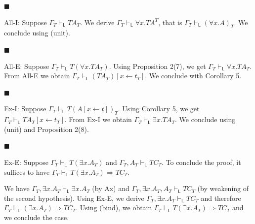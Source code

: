  
 
\par\noindent  $\blacksquare$ 
 
All-I: Suppose $\Gamma_{T}\vdash_{\mathsf{L}}TA_{T}$. We derive $\Gamma_{T}\vdash_{\mathsf{L}}{\forall}x.TA^{T}$, that is $\Gamma_{T}\vdash_{\mathsf{L}}({\forall}x.A)_{T}$. We conclude using (unit).\par
 
 
 
\par\noindent  $\blacksquare$ 
 
All-E: Suppose $\Gamma_{T}\vdash_{\mathsf{L}}T({\forall}x.TA_{T})$. Using Proposition 2(7), we get $\Gamma_{T}\vdash_{\mathsf{L}}{\forall}x.TA_{T}$. From All-E we obtain $\Gamma_{T}\vdash_{\mathsf{L}}(TA_{T})[x\leftarrow t_{T}]$. We conclude with Corollary 5.\par
 
 
 
\par\noindent  $\blacksquare$ 
 
Ex-I: Suppose $\Gamma_{T}\vdash_{\mathsf{L}}T(A[x\leftarrow t])_{T}$. Using Corollary 5, we get $\Gamma_{T}\vdash_{\mathsf{L}}TA_{T}[x\leftarrow t_{T}]$. From Ex-I we obtain $\Gamma_{T}\vdash_{\mathsf{L}}{\exists}x.TA_{T}$. We conclude using (unit) and Proposition 2(8).\par
 
 
 
\par\noindent  $\blacksquare$ 
 
Ex-E: Suppose $\Gamma_{T}\vdash_{\mathsf{L}}T({\exists}x.A_{T})$ and $\Gamma_{T},A_{T}\vdash_{\mathsf{L}}TC_{T}$. To conclude the proof, it suffices to have $\Gamma_{T}\vdash_{\mathsf{L}}T({\exists}x.A_{T})\mathbin{\Rightarrow}TC_{T}$.\par
 
 
 
We have $\Gamma_{T},{\exists}x.A_{T}\vdash_{\mathsf{L}}{\exists}x.A_{T}$ (by Ax) and $\Gamma_{T},{\exists}x.A_{T},A_{T}\vdash_{\mathsf{L}}TC_{T}$ (by weakening of the second hypothesis). Using Ex-E, we derive $\Gamma_{T},{\exists}x.A_{T}\vdash_{\mathsf{L}}TC_{T}$ and therefore $\Gamma_{T}\vdash_{\mathsf{L}}({\exists}x.A_{T})\mathbin{\Rightarrow}TC_{T}$. Using (bind), we obtain $\Gamma_{T}\vdash_{\mathsf{L}}T({\exists}x.A_{T})\mathbin{\Rightarrow}TC_{T}$ and we conclude the case.\par
 
